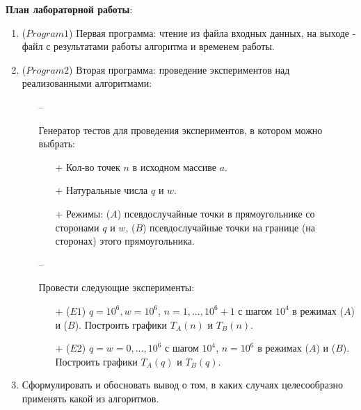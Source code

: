 \newpage

\noindent \textbf{План лабораторной работы}:
\begin{enumerate}
	\item{($Program1$) Первая программа: чтение из файла входных данных, на выходе - файл с результатами работы алгоритма и временем работы.}
	\item{($Program2$) Вторая программа: проведение экспериментов над реализованными алгоритмами:
		\begin{itemize}
			\item[--]{Генератор тестов для проведения экспериментов, в котором можно выбрать:
				\begin{itemize}
					\item[+]{Кол-во точек $n$ в исходном массиве $a$.}
					\item[+]{Натуральные числа $q$ и $w$.}
					\item[+]{Режимы: ($A$) псевдослучайные точки в прямоугольнике со сторонами $q$ и $w$, ($B$) псевдослучайные точки на границе (на сторонах) этого прямоугольника.}
			\end{itemize}}
			\item[--]{Провести следующие эксперименты:
				\begin{itemize}
					\item[+]{($E1$) $q = 10^6, w = 10^6$, $n = 1, ..., 10^6+1$ с шагом $10^4$ в режимах ($A$) и ($B$). Построить графики $T_A(n)$ и $T_B(n)$.}
					\item[+]{($E2$) $q = w = 0, ..., 10^6$ с шагом $10^4$, $n = 10^6$ в режимах ($A$) и ($B$). Построить графики $T_A(q)$ и $T_B(q)$.}
			\end{itemize}}
		\end{itemize}
	}
	\item{Сформулировать и обосновать вывод о том, в каких случаях целесообразно применять какой из алгоритмов.}
\end{enumerate}

\newpage

